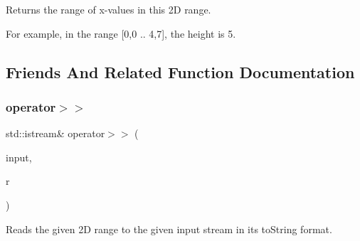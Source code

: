 Returns the range of x-\/values in this 2D range. 

For example, in the range \mbox{[}0,0 .. 4,7\mbox{]}, the height is 5. 

\subsection{Friends And Related Function Documentation}
\mbox{\label{classIntRange2D_a1785cf1b9660abbc492b9fcabe2f7af5}} 
\subsubsection{\texorpdfstring{operator$>$$>$}{operator>>}}
{\footnotesize\ttfamily std\+::istream\& operator$>$$>$ (\begin{DoxyParamCaption}\item[{std\+::istream \&}]{input,  }\item[{\mbox{\hyperlink{classIntRange2D}{Int\+Range2D}} \&}]{r }\end{DoxyParamCaption})\hspace{0.3cm}{\ttfamily [friend]}}



Reads the given 2D range to the given input stream in its to\+String format. 

